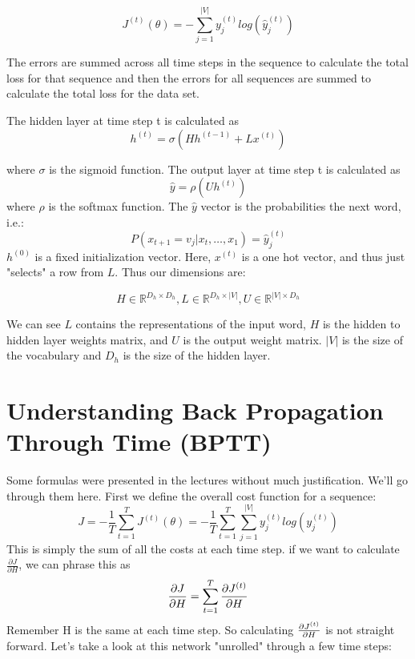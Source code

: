 \documentclass[]{article}
\newcommand{\deriv}[2]{%
	\ensuremath{\frac{\partial {#1}}{\partial {#2}}}}
\newcommand{\slayer}[3]{ %
	\ensuremath{{#1}^{(#2)}_{#3}}}
\newcommand{\vlayer}[2]{ %
	\ensuremath{{#1}^{(#2)}}}
\newcommand{\reals}[1]{ %
	\ensuremath{\in \mathbb{R}^{#1}}}
\begin{document}
$$\vlayer{J}{t}(\theta) = - \sum_{j=1}^{|V|} \slayer{y}{t}{j} log(\slayer{\hat{y}}{t}{j})$$

The errors are summed across all time steps in the sequence to calculate the total loss for that sequence and then the errors for all sequences are summed to calculate the total loss for the data set.

The hidden layer at time step t is calculated as 
$$ \vlayer{h}{t} = \sigma\left(H\vlayer{h}{t-1} + L\vlayer{x}{t}\right)$$

where $\sigma$ is the sigmoid function. The output layer at time step t is calculated as 
$$ \hat{y} = \rho \left(U\vlayer{h}{t}\right)$$
where $\rho$ is the softmax function. The $\hat{y}$ vector is the probabilities the next word, i.e.:
$$P(x_{t+1} = v_j | x_t,\dots,x_1) = \slayer{\hat{y}}{t}{j}$$
$\vlayer{h}{0}$ is a fixed initialization vector. Here, $\vlayer{x}{t}$ is a one hot vector, and thus just "selects" a row from $L$. Thus our dimensions are:

$$H \reals{D_h \times D_h}, L \reals{D_h\times|V|}, U \reals{|V| \times D_h}$$

We can see $L$ contains the representations of the input word, $H$ is the hidden to hidden layer weights matrix, and $U$ is the output weight matrix. $|V|$ is the size of the vocabulary and $D_h$ is the size of the hidden layer.
\section{Understanding Back Propagation Through Time (BPTT)}
Some formulas were presented in the lectures without much justification. We'll go through them here. First we define the overall cost function for a sequence:
$$J = -\frac{1}{T}\sum_{t=1}^{T}\vlayer{J}{t}(\theta) = -\frac{1}{T}\sum_{t=1}^{T}\sum_{j=1}^{|V|}\slayer{y}{t}{j} log(\slayer{y}{t}{j})$$
This is simply the sum of all the costs at each time step. if we want to calculate $\deriv{J}{H}$, we can phrase this as
$$\deriv{J}{H} = \sum_{t=1}^{T} \deriv{\vlayer{J}{t}}{H}$$
Remember H is the same at each time step. So calculating $\deriv{\vlayer{J}{t}}{H}$ is not straight forward. Let's take a look at this network "unrolled" through a few time steps:
\end{document}
